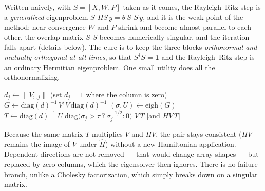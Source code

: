Written naively, with $S = [X, W, P]$ taken as it comes, the Rayleigh--Ritz
step is a \emph{generalized} eigenproblem $S^\dagger H S\, y = \theta\,
S^\dagger S\, y$, and it is the weak point of the method: near convergence
$W$ and $P$ shrink and become almost parallel to each other, the overlap
matrix $S^\dagger S$ becomes numerically singular, and the iteration falls
apart (details below). The cure is to keep the three blocks
\emph{orthonormal and mutually orthogonal at all times}, so that
$S^\dagger S = \mathbf 1$ and the Rayleigh--Ritz step is an ordinary
Hermitian eigenproblem. One small utility does all the orthonormalizing.

\begin{algorithm}[H]
\caption{Orthonormalize the columns of $V$, discarding (zeroing) linearly
dependent directions; optionally carry $HV$ along}
\label{alg:ortho}
\begin{algorithmic}[1]
\State $d_j \gets \|V_{:,j}\|$ (set $d_j = 1$ where the column is zero)
\State $G \gets \mathrm{diag}(d)^{-1}\, V^\dagger V\, \mathrm{diag}(d)^{-1}$
\State $(\sigma, U) \gets \mathrm{eigh}(G)$
\State $T \gets \mathrm{diag}(d)^{-1}\; U\;
\mathrm{diag}\big(\sigma_j > \tau\ ?\ \sigma_j^{-1/2} : 0\big)$
\State \Return $V\,T$ [and $HV\,T$]
\EndFunction
\end{algorithmic}
\end{algorithm}

Because the same matrix $T$ multiplies $V$ and $HV$, the pair stays
consistent ($HV$ remains the image of $V$ under $\hat H$) without a new
Hamiltonian application. Dependent directions are not removed --- that
would change array shapes --- but replaced by zero columns, which the
eigensolver then ignores. There is no failure branch, unlike a Cholesky
factorization, which simply breaks down on a singular matrix.

